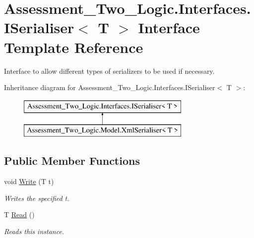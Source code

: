 \hypertarget{interface_assessment___two___logic_1_1_interfaces_1_1_i_serialiser-g}{
\section{Assessment\_\-Two\_\-Logic.Interfaces.ISerialiser$<$ T $>$ Interface Template Reference}
\label{interface_assessment___two___logic_1_1_interfaces_1_1_i_serialiser-g}
}


Interface to allow different types of serializers to be used if necessary.  


Inheritance diagram for Assessment\_\-Two\_\-Logic.Interfaces.ISerialiser$<$ T $>$:\begin{figure}[H]
\begin{center}
\leavevmode
\includegraphics[height=2.000000cm]{interface_assessment___two___logic_1_1_interfaces_1_1_i_serialiser-g}
\end{center}
\end{figure}
\subsection*{Public Member Functions}
\begin{DoxyCompactItemize}
\item 
void \hyperlink{interface_assessment___two___logic_1_1_interfaces_1_1_i_serialiser-g_a27e49aa528ba7cfc7a449940fce2c9ed}{Write} (T t)
\begin{DoxyCompactList}\small\item\em Writes the specified t. \item\end{DoxyCompactList}\item 
T \hyperlink{interface_assessment___two___logic_1_1_interfaces_1_1_i_serialiser-g_abdc82a04f97069876dcf505c25e1390c}{Read} ()
\begin{DoxyCompactList}\small\item\em Reads this instance. \item\end{DoxyCompactList}\end{DoxyCompactItemize}
